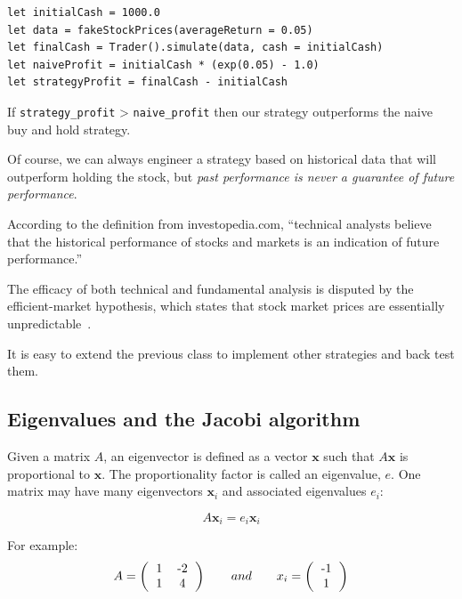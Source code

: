 \documentclass[justified, sixbynine]{tufte-book}
\def\ft{\small\tt}
\theoremstyle{plain}%
\newtheorem * {corollary}{Corollary}
\theoremstyle{definition}
\theoremstyle{remark}
\newtheorem * {remark}{Remark}
\newtheorem * {note}{Note}
\begin{document}
\begin{fullwidth}
\begin{lstlisting}
let initialCash = 1000.0
let data = fakeStockPrices(averageReturn = 0.05)
let finalCash = Trader().simulate(data, cash = initialCash)
let naiveProfit = initialCash * (exp(0.05) - 1.0)
let strategyProfit = finalCash - initialCash
\end{lstlisting}

If {\ft strategy\_profit} > {\ft naive\_profit} then our strategy outperforms the naive buy and hold strategy.

Of course, we can always engineer a strategy based on historical data that will outperform holding the stock, but {\it past performance is never a guarantee of future performance}.

According to the definition from investopedia.com, ``technical analysts believe that the historical performance of stocks and markets is an indication of future performance.''

The efficacy of both technical and fundamental analysis is disputed by the efficient-market hypothesis, which states that stock market prices are essentially unpredictable~\cite{andrew}.

It is easy to extend the previous class to implement other strategies and back test them.

\goodbreak\subsection{Eigenvalues and the Jacobi algorithm}


Given a matrix $A$, an eigenvector is defined as a vector $\mathbf{x}$ such that
$A\mathbf{x}$ is proportional to $\mathbf{x}$.
The proportionality factor is called an eigenvalue, $e$. One matrix may have many eigenvectors $\mathbf{x}_i$ and associated eigenvalues $e_i$:

\begin{equation}
A\mathbf{x}_i = e_i\mathbf{x}_i
\end{equation}

For example:
\begin{equation}
A = \left(\begin{tabular}{ccc}
1 & -2  \\
1 & 4  \\
\end{tabular}\right) \qquad and \qquad
x_i =
\left(\begin{tabular}{c}
-1 \\
1 \\
\end{tabular}\right)
\end{equation}


\end{fullwidth}
\end{document}
